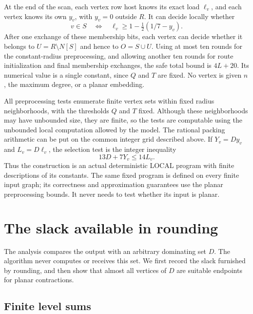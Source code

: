 \documentclass[11pt,a4paper]{article}
\theoremstyle{definition}
\theoremstyle{remark}
\begin{document}
At the end of the scan, each vertex row host knows its exact load
$\ell_v$, and each vertex knows its own $y_v$, with $y_v=0$ outside $R$.
It can decide locally whether
\[
 v\in S
 \quad\Longleftrightarrow\quad
 \ell_v\geq1-\tfrac12(1/7-y_v).
\]
After one exchange of these membership bits, each vertex can decide
whether it belongs to $U=R\setminus N[S]$ and hence to $O=S\cup U$.
Using at most ten rounds for the constant-radius preprocessing, and
allowing another ten rounds for route initialization and final
membership exchanges, the safe total bound is $4L+20$.  Its numerical
value is a single constant, since $Q$ and $T$ are fixed.  No vertex is
given $n$, the maximum degree, or a planar embedding.

All preprocessing tests enumerate finite vertex sets within fixed
radius neighborhoods, with the thresholds $Q$ and $T$ fixed.  Although
these neighborhoods may have unbounded size, they are finite, so the
tests are computable using the unbounded local computation allowed by
the model.  The rational packing arithmetic can be put on the common
integer grid described above.  If $Y_v=Dy_v$ and $L_v=D\ell_v$, the
selection test is the integer inequality
\[
 13D+7Y_v\leq14L_v.
\]
Thus the construction is an actual deterministic LOCAL program with
finite descriptions of its constants.  The same fixed program is
defined on every finite input graph; its correctness and approximation
guarantees use the planar preprocessing bounds.  It never needs to
test whether its input is planar.

\section{The slack available in rounding}
\label{sec:rounding}

The analysis compares the output with an arbitrary dominating set \(D\).
The algorithm never computes or receives this set. We first record the
slack furnished by rounding, and then show that almost all vertices of
\(D\) are suitable endpoints for planar contractions.

\subsection{Finite level sums}
\end{document}
